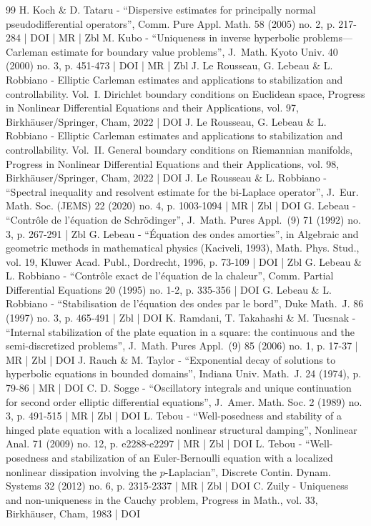 \begin{thebibliography}{99}
H. Koch \& D. Tataru - “Dispersive estimates for principally normal pseudodifferential operators”, Comm. Pure Appl. Math. 58 (2005) no. 2, p. 217-284 | DOI | MR | Zbl
M. Kubo - “Uniqueness in inverse hyperbolic problems—Carleman estimate for boundary value problems”, J. Math. Kyoto Univ. 40 (2000) no. 3, p. 451-473 | DOI | MR | Zbl
J. Le Rousseau, G. Lebeau \& L. Robbiano - Elliptic Carleman estimates and applications to stabilization and controllability. Vol. I. Dirichlet boundary conditions on Euclidean space, Progress in Nonlinear Differential Equations and their Applications, vol. 97, Birkhäuser/Springer, Cham, 2022 | DOI
J. Le Rousseau, G. Lebeau \& L. Robbiano - Elliptic Carleman estimates and applications to stabilization and controllability. Vol. II. General boundary conditions on Riemannian manifolds, Progress in Nonlinear Differential Equations and their Applications, vol. 98, Birkhäuser/Springer, Cham, 2022 | DOI
J. Le Rousseau \& L. Robbiano - “Spectral inequality and resolvent estimate for the bi-Laplace operator”, J. Eur. Math. Soc. (JEMS) 22 (2020) no. 4, p. 1003-1094 | MR | Zbl | DOI
G. Lebeau - “Contrôle de l’équation de Schrödinger”, J. Math. Pures Appl. (9) 71 (1992) no. 3, p. 267-291 | Zbl
G. Lebeau - “Équation des ondes amorties”, in Algebraic and geometric methods in mathematical physics (Kaciveli, 1993), Math. Phys. Stud., vol. 19, Kluwer Acad. Publ., Dordrecht, 1996, p. 73-109 | DOI | Zbl
G. Lebeau \& L. Robbiano - “Contrôle exact de l’équation de la chaleur”, Comm. Partial Differential Equations 20 (1995) no. 1-2, p. 335-356 | DOI
G. Lebeau \& L. Robbiano - “Stabilisation de l’équation des ondes par le bord”, Duke Math. J. 86 (1997) no. 3, p. 465-491 | Zbl | DOI
K. Ramdani, T. Takahashi \& M. Tucsnak - “Internal stabilization of the plate equation in a square: the continuous and the semi-discretized problems”, J. Math. Pures Appl. (9) 85 (2006) no. 1, p. 17-37 | MR | Zbl | DOI
J. Rauch \& M. Taylor - “Exponential decay of solutions to hyperbolic equations in bounded domains”, Indiana Univ. Math. J. 24 (1974), p. 79-86 | MR | DOI
C. D. Sogge - “Oscillatory integrals and unique continuation for second order elliptic differential equations”, J. Amer. Math. Soc. 2 (1989) no. 3, p. 491-515 | MR | Zbl | DOI
L. Tebou - “Well-posedness and stability of a hinged plate equation with a localized nonlinear structural damping”, Nonlinear Anal. 71 (2009) no. 12, p. e2288-e2297 | MR | Zbl | DOI
L. Tebou - “Well-posedness and stabilization of an Euler-Bernoulli equation with a localized nonlinear dissipation involving the $p$-Laplacian”, Discrete Contin. Dynam. Systems 32 (2012) no. 6, p. 2315-2337 | MR | Zbl | DOI
C. Zuily - Uniqueness and non-uniqueness in the Cauchy problem, Progress in Math., vol. 33, Birkhäuser, Cham, 1983 | DOI
\end{thebibliography}
